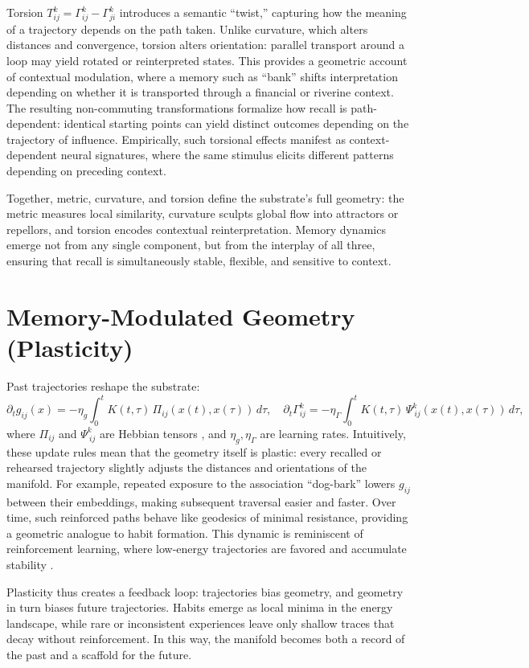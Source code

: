 \documentclass[a4paper,12pt]{article}
\begin{document}
Torsion $T^k_{ij} = \Gamma^k_{ij} - \Gamma^k_{ji}$ introduces a semantic ``twist,'' 
capturing how the meaning of a trajectory depends on the path taken. Unlike curvature, 
which alters distances and convergence, torsion alters orientation: parallel transport 
around a loop may yield rotated or reinterpreted states. This provides a geometric account 
of contextual modulation, where a memory such as ``bank'' shifts interpretation depending 
on whether it is transported through a financial or riverine context. The resulting 
non-commuting transformations formalize how recall is path-dependent: identical starting 
points can yield distinct outcomes depending on the trajectory of influence. Empirically, 
such torsional effects manifest as context-dependent neural signatures, where the same 
stimulus elicits different patterns depending on preceding context.

Together, metric, curvature, and torsion define the substrate’s full geometry: 
the metric measures local similarity, curvature sculpts global flow into attractors or 
repellors, and torsion encodes contextual reinterpretation. Memory dynamics emerge not 
from any single component, but from the interplay of all three, ensuring that recall is 
simultaneously stable, flexible, and sensitive to context.

\section{Memory-Modulated Geometry (Plasticity)}
Past trajectories reshape the substrate:
\[
\partial_t g_{ij}(x) = -\eta_g \int_0^t K(t,\tau) \, \Pi_{ij}(x(t), x(\tau)) \, d\tau, \quad \partial_t \Gamma^k_{ij} = -\eta_\Gamma \int_0^t K(t,\tau) \, \Psi^k_{\ ij}(x(t), x(\tau)) \, d\tau,
\]
where $\Pi_{ij}$ and $\Psi^k_{\ ij}$ are Hebbian tensors \citep{hebb1949organization}, and $\eta_g, \eta_\Gamma$ are learning rates. Intuitively, these update rules mean that the geometry itself is plastic: every recalled or rehearsed trajectory slightly adjusts the distances and orientations of the manifold. For example, repeated exposure to the association ``dog-bark'' lowers $g_{ij}$ between their embeddings, making subsequent traversal easier and faster. Over time, such reinforced paths behave like geodesics of minimal resistance, providing a geometric analogue to habit formation. This dynamic is reminiscent of reinforcement learning, where low-energy trajectories are favored and accumulate stability \citep{sutton2018reinforcement}. 

Plasticity thus creates a feedback loop: trajectories bias geometry, and geometry in turn biases future trajectories. Habits emerge as local minima in the energy landscape, while rare or inconsistent experiences leave only shallow traces that decay without reinforcement. In this way, the manifold becomes both a record of the past and a scaffold for the future.
\end{document}
